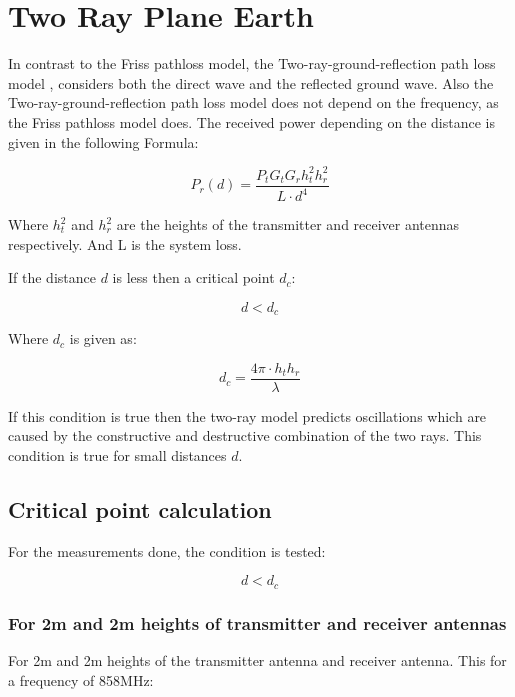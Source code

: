 \section{Two Ray Plane Earth}
In contrast to the Friss pathloss model, the Two-ray-ground-reflection path loss model \citep{two_ray}, considers both the direct wave and the reflected ground wave. Also the Two-ray-ground-reflection path loss model does not depend on the frequency, as the Friss pathloss model does. The received power depending on the distance is given in the following Formula:

\begin{equation}
P_r(d) = \frac{P_t G_t G_r h^2_t h^2_r}{L \cdot d^4}
\label{two_ray_model}
\end{equation}

Where $h^2_t$ and $h^2_r$ are the heights of the transmitter and receiver antennas respectively. And L is the system loss. 

If the distance $d$ is less then a critical point $d_{c}$: 

\begin{equation}
d<d_{c}
\label{two_ray_cond}
\end{equation}

Where $d_{c}$ is given as:

\begin{equation}
d_{c} = \frac{4\pi \cdot h_t h_r}{\lambda}
\label{critical_fac_dc}
\end{equation}

If this condition is true then the two-ray model predicts oscillations which are caused by the constructive and destructive combination of the two rays. This condition is true for small distances $d$.

\subsection{Critical point calculation}
For the measurements done, the condition is tested:

\begin{equation}
d<d_{c}
\label{two_ray_cond_1}
\end{equation}

\subsubsection{For 2m and 2m heights of transmitter and receiver antennas}

For 2m and 2m heights of the transmitter antenna and receiver antenna. This for a frequency of 858MHz:

